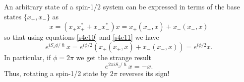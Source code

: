\documentclass{article}
\numberwithin{equation}{section}
\begin{document}
An arbitrary state of a spin-1/2 system can be expressed in terms of the
base states $\{x_+, x_-\}$ as
\begin{equation}\label{s4e30}
x = (x_+x_+^\ast + x_-x_-^\ast)x = x_+(x_+, x) + x_-(x_-, x)
\end{equation}
so that using equations \eqref{s4e10} and \eqref{s4e11} we have
\begin{equation}\label{s4e31}
e^{iS_z\phi/\hslash}x = e^{i\phi/2}(x_+(x_+,x)+x_-(x_-,x))=e^{i\phi/2}x.
\end{equation}
In particular, if $\phi = 2\pi$ we get the strange result
\begin{equation}\label{s4e32}
e^{2\pi i S_z/\hslash}x = -x.
\end{equation}
Thus, rotating a spin-1/2 state by $2\pi$ reverses its sign!
\end{document}
